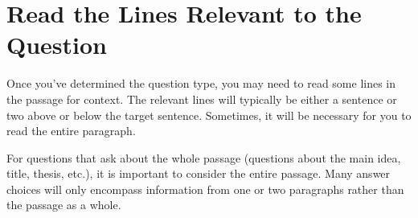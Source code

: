 \section{Read the Lines Relevant to the Question}

Once you've determined the question type, you may need to read some lines in the passage for
context. The relevant lines will typically be either a sentence or two above or below the target
sentence. Sometimes, it will be necessary for you to read the entire paragraph.

For questions that ask about the whole passage (questions about the main idea, title, thesis, etc.), it is important to consider the entire passage. Many answer choices will only encompass information from one or two paragraphs rather than the passage as a whole. 
